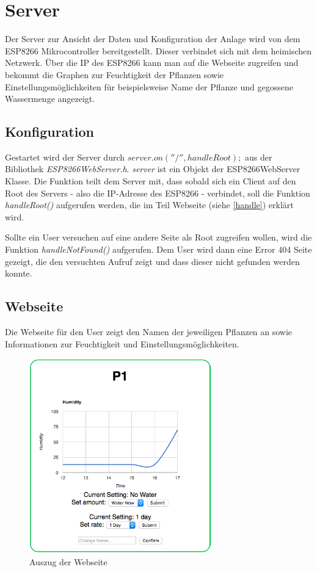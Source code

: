\section{Server}
Der Server zur Ansicht der Daten und Konfiguration der Anlage wird von dem ESP8266
Mikrocontroller bereitgestellt. Dieser verbindet sich mit dem heimischen Netzwerk.
Über die IP des ESP8266 kann man auf die Webseite zugreifen und bekommt die Graphen
zur Feuchtigkeit der Pflanzen sowie Einstellungsmöglichkeiten für beispielsweise Name
der Pflanze und gegossene Wassermenge angezeigt.

\subsection{Konfiguration}
Gestartet wird der Server durch $server.on(''/'', handleRoot);$ aus der Bibliothek \textit{ESP8266WebServer.h}. \textit{server} ist ein Objekt der ESP8266WebServer Klasse. Die Funktion teilt dem
Server mit, dass sobald sich ein Client auf den Root des Servers - also die IP-Adresse
des ESP8266 - verbindet, soll die Funktion \textit{handleRoot()} aufgerufen werden, die im Teil
Webseite (siehe \ref{handle}) erklärt wird.

Sollte ein User versuchen auf eine andere Seite als Root zugreifen wollen, wird die
Funktion \textit{handleNotFound()} aufgerufen. Dem User wird dann eine Error 404 Seite gezeigt,
die den versuchten Aufruf zeigt und dass dieser nicht gefunden werden konnte.

\subsection{Webseite}
Die Webseite für den User zeigt den Namen der jeweiligen Pflanzen an sowie Informationen
zur Feuchtigkeit und Einstellungsmöglichkeiten.
\begin{figure}[ht]
    \centering
    \includegraphics[width=0.7\textwidth]{images/seite2}
    \caption{Auszug der Webseite}
\end{figure}

